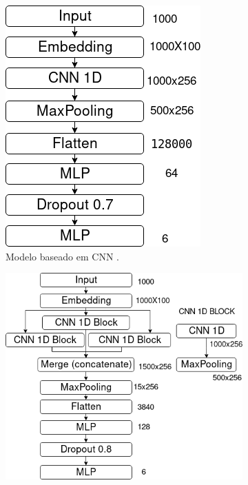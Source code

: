 \begin{figure}
    \centering
    \begin{subfigure}[b]{0.25\textwidth}
        \includegraphics[width=\textwidth]{figuras/modelos-CNN}
        \caption{Modelo baseado em CNN \cite{da_silva_document_2018}.}
        \label{fig:cnn}
    \end{subfigure}\hfill
    \begin{subfigure}[b]{0.4\textwidth}
        \includegraphics[width=\textwidth]{figuras/modelos-CNN-rand}

\end{subfigure}
\end{figure}
